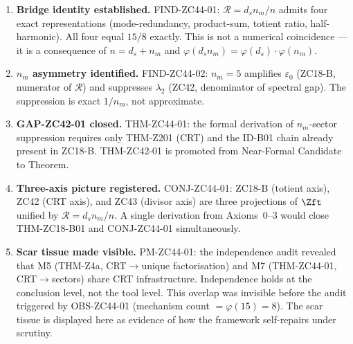 \documentclass[12pt, a4paper]{article}
\providecommand{\eps}{\varepsilon_0}
\providecommand{\ltwo}{\lambda_2}
\providecommand{\nm}{n_m}
\providecommand{\ds}{d_s}
\providecommand{\phitot}{\varphi}
\providecommand{\Rcal}{\mathcal{R}}
\begin{document}

\begin{keybox}[title={ZC44 Summary: Three Results}]
\begin{enumerate}[leftmargin=*, itemsep=3pt]
\item \textbf{Bridge identity established.}
  FIND-ZC44-01: $\Rcal = \ds\nm/n$ admits four exact
  representations (mode-redundancy, product-sum, totient
  ratio, half-harmonic). All four equal $15/8$ exactly.
  This is not a numerical coincidence --- it is a
  consequence of $n = \ds + \nm$ and
  $\phitot(\ds\nm) = \phitot(\ds)\cdot\phitot(\nm)$.

\item \textbf{$n_m$ asymmetry identified.}
  FIND-ZC44-02: $\nm = 5$ amplifies $\eps$ (ZC18-B,
  numerator of $\Rcal$) and suppresses $\ltwo$ (ZC42,
  denominator of spectral gap).
  The suppression is exact $1/\nm$, not approximate.

\item \textbf{GAP-ZC42-01 closed.}
  THM-ZC44-01: the formal derivation of $\nm$-sector
  suppression requires only THM-Z201 (CRT) and the
  ID-B01 chain already present in ZC18-B.
  THM-ZC42-01 is promoted from Near-Formal Candidate
  to Theorem.

\item \textbf{Three-axis picture registered.}
  CONJ-ZC44-01: ZC18-B (totient axis), ZC42 (CRT axis),
  and ZC43 (divisor axis) are three projections of
  $\Zft$ unified by $\Rcal = \ds\nm/n$.
  A single derivation from Axioms~0--3 would close
  THM-ZC18-B01 and CONJ-ZC44-01 simultaneously.

\item \textbf{Scar tissue made visible.}
  PM-ZC44-01: the independence audit revealed that M5
  (THM-Z4a, CRT$\to$unique factorisation) and M7
  (THM-ZC44-01, CRT$\to$sectors) share CRT infrastructure.
  Independence holds at the conclusion level, not the
  tool level.
  This overlap was invisible before the audit triggered
  by OBS-ZC44-01 (mechanism count $= \phitot(15) = 8$).
  The scar tissue is displayed here as evidence of how
  the framework self-repairs under scrutiny.
\end{enumerate}
\end{keybox}
\end{document}
